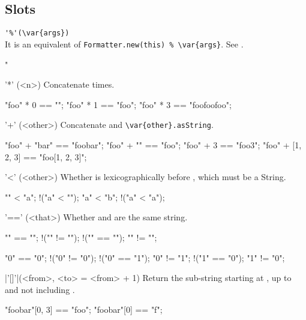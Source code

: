 \subsection{Slots}
\begin{urbiscriptapi}
\item \lstinline|'%'(\var{args})|\\
  It is an equivalent of \lstinline|Formatter.new(this) % \var{args}|.
  See .
\begin{urbiassert}
"%
\end{urbiassert}


\item['*'](<n>)%
  Concatenate \this {} times.
\begin{urbiassert}
"foo" * 0 == "";
"foo" * 1 == "foo";
"foo" * 3 == "foofoofoo";
\end{urbiassert}


\item['+'](<other>)%
  Concatenate \this and \lstinline|\var{other}.asString|.
\begin{urbiassert}
"foo" + "bar" == "foobar";
"foo" + "" == "foo";
"foo" + 3 == "foo3";
"foo" + [1, 2, 3] == "foo[1, 2, 3]";
\end{urbiassert}


\item['<'](<other>)%
  Whether \this is lexicographically before ,
  which must be a String.
\begin{urbiassert}
"" < "a";
!("a" < "");
"a" < "b";
!("a" < "a");
\end{urbiassert}


\item['=='](<that>)%
  Whether \this and  are the same string.
\begin{urbiassert}
  "" == "";        !("" != "");
!("" == "\0");       "" != "\0";

  "0" == "0";      !("0" != "0");
!("0" == "1");       "0" != "1";
!("1" == "0");       "1" != "0";
\end{urbiassert}


\item|'[]'|(<from>, <to> = <from> + 1)%
  Return the sub-string starting at , up to and not including
  .
\begin{urbiassert}
"foobar"[0, 3] == "foo";
"foobar"[0] == "f";
\end{urbiassert}


\end{urbiscriptapi}
